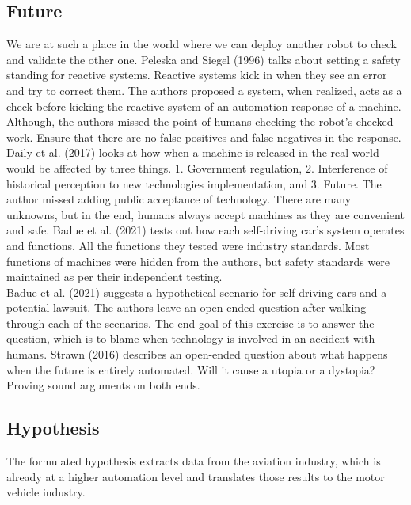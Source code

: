 \documentclass[
  man,floatsintext]{apa7}
\begin{document}
\hypertarget{future}{%
\subsection{Future}\label{future}}

We are at such a place in the world where we can deploy another robot to check and validate the other one. Peleska and Siegel (1996) talks about setting a safety standing for reactive systems. Reactive systems kick in when they see an error and try to correct them. The authors proposed a system, when realized, acts as a check before kicking the reactive system of an automation response of a machine. Although, the authors missed the point of humans checking the robot's checked work. Ensure that there are no false positives and false negatives in the response. Daily et al. (2017) looks at how when a machine is released in the real world would be affected by three things. 1. Government regulation, 2. Interference of historical perception to new technologies implementation, and 3. Future. The author missed adding public acceptance of technology. There are many unknowns, but in the end, humans always accept machines as they are convenient and safe. Badue et al. (2021) tests out how each self-driving car's system operates and functions. All the functions they tested were industry standards. Most functions of machines were hidden from the authors, but safety standards were maintained as per their independent testing.\\

Badue et al. (2021) suggests a hypothetical scenario for self-driving cars and a potential lawsuit. The authors leave an open-ended question after walking through each of the scenarios. The end goal of this exercise is to answer the question, which is to blame when technology is involved in an accident with humans. Strawn (2016) describes an open-ended question about what happens when the future is entirely automated. Will it cause a utopia or a dystopia? Proving sound arguments on both ends.\\

\hypertarget{hypothesis}{%
\subsection{Hypothesis}\label{hypothesis}}

The formulated hypothesis extracts data from the aviation industry, which is already at a higher automation level and translates those results to the motor vehicle industry.
\end{document}
